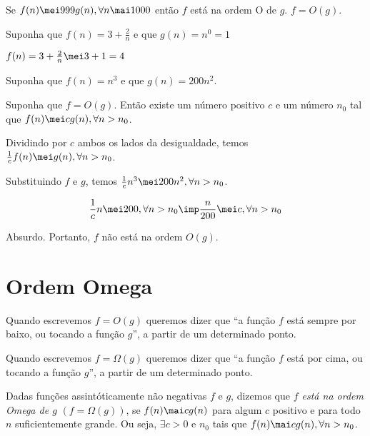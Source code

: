\documentclass[a4paper]{memoir}
\begin{document}
\begin{ex}
Se $f(n) \mei 999 g (n), \forall n \mai 1000$ então $f$ está na ordem O de $g$. $f = O(g)$.
\end{ex}

\begin{ex}
Suponha que $f(n) = 3 + \frac{2}{n}$ e que $g(n) = n^0 = 1$
\end{ex}

\begin{sol}
$f(n) = 3 + \frac{2}{n} \mei 3 + 1 = 4$
\end{sol}

\begin{ex}
Suponha que $f(n) = n^3$ e que $g(n) = 200n^2$.
\end{ex}

\begin{sol}
Suponha que $f = O(g)$. Então existe um número positivo $c$ e um número $n_0$ tal que $f(n) \mei c g(n), \forall n > n_0$.

Dividindo por $c$ ambos os lados da desigualdade, temos\\
$\frac{1}{c} f(n) \mei g(n), \forall n > n_0$.

Substituindo $f$ e $g$, temos $\frac{1}{c}n^3 \mei 200n^2, \forall n > n_0$.

\[
\frac{1}{c}n \mei 200, \forall n > n_0 \imp \frac{n}{200} \mei c, \forall n > n_0
\]

Absurdo. Portanto, $f$ não está na ordem $O(g).$
\end{sol}

\section{Ordem Omega}

Quando escrevemos $f = O(g)$ queremos dizer que ``a função $f$ está sempre por baixo, ou tocando a função $g$'', a partir de um determinado ponto.

Quando escrevemos $f = \Omega(g)$ queremos dizer que ``a função $f$ está por cima, ou tocando a função $g$'', a partir de um determinado ponto.

\begin{defn}
Dadas funções assintóticamente não negativas $f$ e $g$, dizemos que \emph{$f$ está na ordem Omega de $g$} $(f = \Omega(g))$, se $f(n) \mai c g(n)$ para algum $c$ positivo e para todo $n$ suficientemente grande. Ou seja, $\exists c > 0$ e $n_0$ tais que $f(n) \mai c g(n), \forall n > n_0$.
\end{defn}
\end{document}
